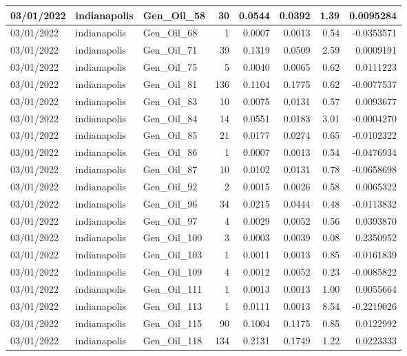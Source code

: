 \documentclass[
  letterpaper,
  DIV=11,
  numbers=noendperiod]{scrartcl}
\begin{document}
\begin{tabular}{l|l|l|r|r|r|r|r}
\hline
03/01/2022 & indianapolis & Gen\_Oil\_58 & 30 & 0.0544 & 0.0392 & 1.39 & 0.0095284\\
\hline
03/01/2022 & indianapolis & Gen\_Oil\_68 & 1 & 0.0007 & 0.0013 & 0.54 & -0.0353571\\
\hline
03/01/2022 & indianapolis & Gen\_Oil\_71 & 39 & 0.1319 & 0.0509 & 2.59 & 0.0009191\\
\hline
03/01/2022 & indianapolis & Gen\_Oil\_75 & 5 & 0.0040 & 0.0065 & 0.62 & 0.0111223\\
\hline
03/01/2022 & indianapolis & Gen\_Oil\_81 & 136 & 0.1104 & 0.1775 & 0.62 & -0.0077537\\
\hline
03/01/2022 & indianapolis & Gen\_Oil\_83 & 10 & 0.0075 & 0.0131 & 0.57 & 0.0093677\\
\hline
03/01/2022 & indianapolis & Gen\_Oil\_84 & 14 & 0.0551 & 0.0183 & 3.01 & -0.0004270\\
\hline
03/01/2022 & indianapolis & Gen\_Oil\_85 & 21 & 0.0177 & 0.0274 & 0.65 & -0.0102322\\
\hline
03/01/2022 & indianapolis & Gen\_Oil\_86 & 1 & 0.0007 & 0.0013 & 0.54 & -0.0476934\\
\hline
03/01/2022 & indianapolis & Gen\_Oil\_87 & 10 & 0.0102 & 0.0131 & 0.78 & -0.0658698\\
\hline
03/01/2022 & indianapolis & Gen\_Oil\_92 & 2 & 0.0015 & 0.0026 & 0.58 & 0.0065322\\
\hline
03/01/2022 & indianapolis & Gen\_Oil\_96 & 34 & 0.0215 & 0.0444 & 0.48 & -0.0113832\\
\hline
03/01/2022 & indianapolis & Gen\_Oil\_97 & 4 & 0.0029 & 0.0052 & 0.56 & 0.0393870\\
\hline
03/01/2022 & indianapolis & Gen\_Oil\_100 & 3 & 0.0003 & 0.0039 & 0.08 & 0.2350952\\
\hline
03/01/2022 & indianapolis & Gen\_Oil\_103 & 1 & 0.0011 & 0.0013 & 0.85 & -0.0161839\\
\hline
03/01/2022 & indianapolis & Gen\_Oil\_109 & 4 & 0.0012 & 0.0052 & 0.23 & -0.0085822\\
\hline
03/01/2022 & indianapolis & Gen\_Oil\_111 & 1 & 0.0013 & 0.0013 & 1.00 & 0.0055664\\
\hline
03/01/2022 & indianapolis & Gen\_Oil\_113 & 1 & 0.0111 & 0.0013 & 8.54 & -0.2219026\\
\hline
03/01/2022 & indianapolis & Gen\_Oil\_115 & 90 & 0.1004 & 0.1175 & 0.85 & 0.0122992\\
\hline
03/01/2022 & indianapolis & Gen\_Oil\_118 & 134 & 0.2131 & 0.1749 & 1.22 & 0.0223333\\

\end{tabular}
\end{document}
